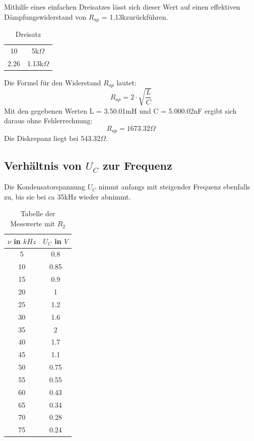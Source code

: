 Mithilfe eines einfachen Dreisatzes lässt sich dieser Wert auf einen effektiven Dämpfungswiderstand von \(R_{ap}\) = 1,13k\Omega zurückführen.

\begin{table}
  \centering
  \caption{Dreisatz}
  \label{tab:drei}
  \begin{tabular}{c c}
    \midrule
    10 & 5k\(\Omega\)\\
    2.26 & 1.13k\(\Omega\)\\
    \bottomrule
  \end{tabular}
\end{table}
Die Formel für den Widerstand \(R_{ap}\) lautet:
\begin{equation}
  R_{ap} = 2\cdot\sqrt{\frac{L}{C}}
\end{equation}
Mit den gegebenen Werten L = 3.5\pm0.01mH und C = 5.00\pm0.02nF ergibt sich daraus ohne Fehlerrechnung:
\begin{equation}
  R_{ap} = 1673.32\Omega
\end{equation}
Die Diskrepanz liegt bei 543.32\(\Omega\).

\newpage
\subsection{Verhältnis von \(U_C\) zur Frequenz}
Die Kondensatorspannung \(U_C\) nimmt anfangs mit steigender Frequenz ebenfalls zu, bis sie bei ca 35kHz wieder abnimmt.
\begin{table}
  \centering
  \caption{Tabelle der Messwerte mit \(R_2\)}
  \label{tab:tab2}
  \begin{tabular}{c c}
    \toprule
    $\nu$ in $kHz$ & \(U_C\) in $V$\\
    \midrule
    5 & 0.8\\
    10 & 0.85\\
    15 & 0.9\\
    20 & 1\\
    25 & 1.2\\
    30 & 1.6\\
    35 & 2\\
    40 & 1.7\\
    45 & 1.1\\
    50 & 0.75\\
    55 & 0.55\\
    60 & 0.43\\
    65 & 0.34\\
    70 & 0.28\\
    75 & 0.24\\
    \bottomrule
  \end{tabular}
\end{table}

